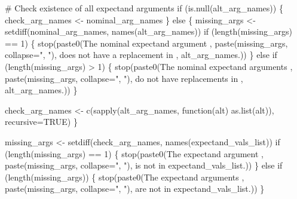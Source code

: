 \documentclass[
  letterpaper,
  DIV=11,
  numbers=noendperiod]{scrartcl}
\newenvironment{Shaded}{\begin{snugshade}}{\end{snugshade}}
\newcommand{\BuiltInTok}[1]{\textcolor[rgb]{0.00,0.23,0.31}{#1}}
\newcommand{\CommentTok}[1]{\textcolor[rgb]{0.37,0.37,0.37}{#1}}
\newcommand{\ControlFlowTok}[1]{\textcolor[rgb]{0.00,0.23,0.31}{#1}}
\newcommand{\DecValTok}[1]{\textcolor[rgb]{0.68,0.00,0.00}{#1}}
\newcommand{\ImportTok}[1]{\textcolor[rgb]{0.00,0.46,0.62}{#1}}
\newcommand{\KeywordTok}[1]{\textcolor[rgb]{0.00,0.23,0.31}{#1}}
\newcommand{\NormalTok}[1]{\textcolor[rgb]{0.00,0.23,0.31}{#1}}
\newcommand{\OperatorTok}[1]{\textcolor[rgb]{0.37,0.37,0.37}{#1}}
\newcommand{\StringTok}[1]{\textcolor[rgb]{0.13,0.47,0.30}{#1}}
\begin{document}
\begin{Shaded}
\begin{Highlighting}[]
  \CommentTok{\# Check existence of all expectand arguments}
  \ControlFlowTok{if}\NormalTok{ (}\KeywordTok{is}\NormalTok{.null(alt\_arg\_names)) \{}
\NormalTok{    check\_arg\_names }\OperatorTok{\textless{}{-}}\NormalTok{ nominal\_arg\_names}
\NormalTok{  \} }\ControlFlowTok{else}\NormalTok{ \{}
\NormalTok{    missing\_args }\OperatorTok{\textless{}{-}}\NormalTok{ setdiff(nominal\_arg\_names, names(alt\_arg\_names))}
    \ControlFlowTok{if}\NormalTok{ (length(missing\_args) }\OperatorTok{==} \DecValTok{1}\NormalTok{) \{}
\NormalTok{      stop(paste0(}\StringTok{\textquotesingle{}The nominal expectand argument \textquotesingle{}}\NormalTok{,}
\NormalTok{                  paste(missing\_args, collapse}\OperatorTok{=}\StringTok{", "}\NormalTok{),}
                  \StringTok{\textquotesingle{} does not have a replacement in \textquotesingle{}}\NormalTok{,}
                  \StringTok{\textquotesingle{}\textasciigrave{}alt\_arg\_names\textasciigrave{}.\textquotesingle{}}\NormalTok{))}
\NormalTok{    \} }\ControlFlowTok{else} \ControlFlowTok{if}\NormalTok{ (length(missing\_args) }\OperatorTok{\textgreater{}} \DecValTok{1}\NormalTok{) \{}
\NormalTok{      stop(paste0(}\StringTok{\textquotesingle{}The nominal expectand arguments \textquotesingle{}}\NormalTok{,}
\NormalTok{                  paste(missing\_args, collapse}\OperatorTok{=}\StringTok{", "}\NormalTok{),}
                  \StringTok{\textquotesingle{} do not have replacements in \textquotesingle{}}\NormalTok{,}
                  \StringTok{\textquotesingle{}\textasciigrave{}alt\_arg\_names\textasciigrave{}.\textquotesingle{}}\NormalTok{))}
\NormalTok{    \}}

\NormalTok{    check\_arg\_names }\OperatorTok{\textless{}{-}}\NormalTok{ c(sapply(alt\_arg\_names,}
\NormalTok{                                function(alt) }\ImportTok{as}\NormalTok{.}\BuiltInTok{list}\NormalTok{(alt)),}
\NormalTok{                         recursive}\OperatorTok{=}\NormalTok{TRUE)}
\NormalTok{  \}}

\NormalTok{  missing\_args }\OperatorTok{\textless{}{-}}\NormalTok{ setdiff(check\_arg\_names, names(expectand\_vals\_list))}
  \ControlFlowTok{if}\NormalTok{ (length(missing\_args) }\OperatorTok{==} \DecValTok{1}\NormalTok{) \{}
\NormalTok{    stop(paste0(}\StringTok{\textquotesingle{}The expectand argument \textquotesingle{}}\NormalTok{,}
\NormalTok{                paste(missing\_args, collapse}\OperatorTok{=}\StringTok{", "}\NormalTok{),}
                \StringTok{\textquotesingle{} is not in \textasciigrave{}expectand\_vals\_list\textasciigrave{}.\textquotesingle{}}\NormalTok{))}
\NormalTok{  \} }\ControlFlowTok{else} \ControlFlowTok{if}\NormalTok{ (length(missing\_args)) \{}
\NormalTok{    stop(paste0(}\StringTok{\textquotesingle{}The expectand arguments \textquotesingle{}}\NormalTok{,}
\NormalTok{                paste(missing\_args, collapse}\OperatorTok{=}\StringTok{", "}\NormalTok{),}
                \StringTok{\textquotesingle{} are not in \textasciigrave{}expectand\_vals\_list\textasciigrave{}.\textquotesingle{}}\NormalTok{))}
\NormalTok{  \}}


\end{Highlighting}
\end{Shaded}
\end{document}
